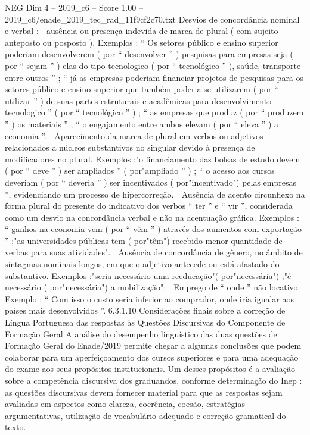 \begin{textsample}{NEG Dim 4 – 2019\_c6 – Score 1.00 – 2019\_c6/enade\_2019\_tec\_rad\_11f9cf2c70.txt}
Desvios de concordância nominal e verbal :  ausência ou presença indevida de marca de plural ( com sujeito anteposto ou posposto ).
Exemplos : “ Os setores público e ensino superior poderiam desenvolverem ( por “ desenvolver ” ) pesquisas para empresas seja ( por “ sejam ” ) elas do tipo tecnologico ( por “ tecnológico ” ), saúde, transporte entre outros ” ; “ já as empresas poderiam financiar projetos de pesquisas para os setores público e ensino superior que também poderia se utilizarem ( por “ utilizar ” ) de suas partes estruturais e acadêmicas para desenvolvimento tecnologico ” ( por “ tecnológico ” ) ; “ as empresas que produz ( por “ produzem ” ) os materiais ” ; “ o engajamento entre ambos elevam ( por “ eleva ” ) a economia ”.  Aparecimento da marca de plural em verbos ou adjetivos relacionados a núcleos substantivos no singular devido à presença de modificadores no plural.
Exemplos :"o financiamento das bolsas de estudo devem ( por “ deve ” ) ser ampliados ” ( por"ampliado ” ) ; “ o acesso aos cursos deveriam ( por “ deveria ” ) ser incentivados ( por"incentivado") pelas empresas ”, evidenciando um processo de hipercorreção.  Ausência de acento circunflexo na forma plural do presente do indicativo dos verbos “ ter ” e “ vir ”, considerada como um desvio na concordância verbal e não na acentuação gráfica.
Exemplos : “ ganhos na economia vem ( por “ vêm ” ) através dos aumentos com exportação ” ;"as universidades públicas tem ( por"têm") recebido menor quantidade de verbas para suas atividades".  Ausência de concordância de gênero, no âmbito de sintagmas nominais longos, em que o adjetivo antecede ou está afastado do substantivo.
Exemplos :"seria necessário uma reeducação"( por"necessária") ;"é necessário ( por"necessária") a mobilização";  Emprego de “ onde ” não locativo.
Exemplo : “ Com isso o custo seria inferior ao comprador, onde iria igualar aos países mais desenvolvidos ”. 6.3.1.10 Considerações finais sobre a correção de Língua Portuguesa das respostas às Questões Discursivas do Componente de Formação Geral A análise do desempenho linguístico das duas questões de Formação Geral do Enade/2019 permite chegar a algumas conclusões que podem colaborar para um aperfeiçoamento dos cursos superiores e para uma adequação do exame aos seus propósitos institucionais.
Um desses propósitos é a avaliação sobre a competência discursiva dos graduandos, conforme determinação do Inep : as questões discursivas devem fornecer material para que as respostas sejam avaliadas em aspectos como clareza, coerência, coesão, estratégias argumentativas, utilização de vocabulário adequado e correção gramatical do texto.

\end{textsample}
